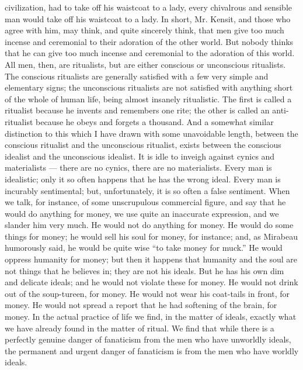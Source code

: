 civilization, had to take off his waistcoat to a lady, every chivalrous and sensible man would take off his waistcoat to a lady. In short, Mr. Kensit, and those who agree with him, may think, and quite sincerely think, that men give too much incense and ceremonial to their adoration of the other world. But nobody thinks that he can give too much incense and ceremonial to the adoration of this world. All men, then, are ritualists, but are either conscious or unconscious ritualists. The conscious ritualists are generally satisfied with a few very simple and elementary signs; the unconscious ritualists are not satisfied with anything short of the whole of human life, being almost insanely ritualistic. The first is called a ritualist because he invents and remembers one rite; the other is called an anti-ritualist because he obeys and forgets a thousand. And a somewhat similar distinction to this which I have drawn with some unavoidable length, between the conscious ritualist and the unconscious ritualist, exists between the conscious idealist and the unconscious idealist. It is idle to inveigh against cynics and materialists — there are no cynics, there are no materialists. Every man is idealistic; only it so often happens that he has the wrong ideal. Every man is incurably sentimental; but, unfortunately, it is so often a false sentiment. When we talk, for instance, of some unscrupulous commercial figure, and say that he would do anything for money, we use quite an inaccurate expression, and we slander him very much. He would not do anything for money. He would do some things for money; he would sell his soul for money, for instance; and, as Mirabeau humorously said, he would be quite wise “to take money for muck.” He would oppress humanity for money; but then it happens that humanity and the soul are not things that he believes in; they are not his ideals. But he has his own dim and delicate ideals; and he would not violate these for money. He would not drink out of the soup-tureen, for money. He would not wear his coat-tails in front, for money. He would not spread a report that he had softening of the brain, for money. In the actual practice of life we find, in the matter of ideals, exactly what we have already found in the matter of ritual. We find that while there is a perfectly genuine danger of fanaticism from the men who have unworldly ideals, the permanent and urgent danger of fanaticism is from the men who have worldly ideals.

